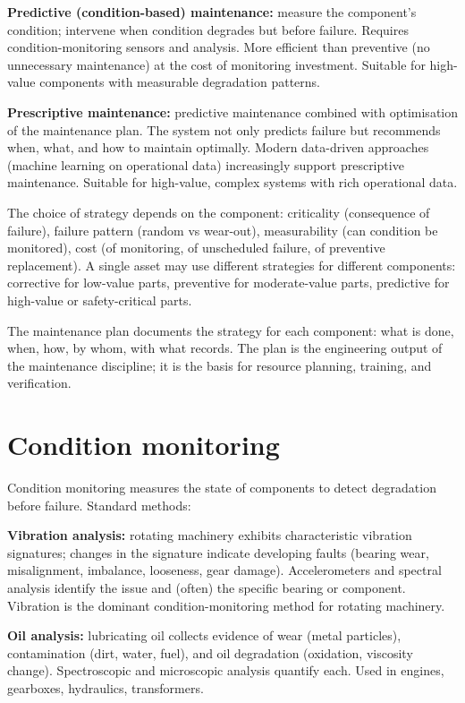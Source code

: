 \textbf{Predictive (condition-based) maintenance:} measure the component's condition; intervene when condition degrades but before failure. Requires condition-monitoring sensors and analysis. More efficient than preventive (no unnecessary maintenance) at the cost of monitoring investment. Suitable for high-value components with measurable degradation patterns.

\textbf{Prescriptive maintenance:} predictive maintenance combined with optimisation of the maintenance plan. The system not only predicts failure but recommends when, what, and how to maintain optimally. Modern data-driven approaches (machine learning on operational data) increasingly support prescriptive maintenance. Suitable for high-value, complex systems with rich operational data.

The choice of strategy depends on the component: criticality (consequence of failure), failure pattern (random vs wear-out), measurability (can condition be monitored), cost (of monitoring, of unscheduled failure, of preventive replacement). A single asset may use different strategies for different components: corrective for low-value parts, preventive for moderate-value parts, predictive for high-value or safety-critical parts.

The maintenance plan documents the strategy for each component: what is done, when, how, by whom, with what records. The plan is the engineering output of the maintenance discipline; it is the basis for resource planning, training, and verification.

\section{Condition monitoring}

Condition monitoring measures the state of components to detect degradation before failure. Standard methods:

\textbf{Vibration analysis:} rotating machinery exhibits characteristic vibration signatures; changes in the signature indicate developing faults (bearing wear, misalignment, imbalance, looseness, gear damage). Accelerometers and spectral analysis identify the issue and (often) the specific bearing or component. Vibration is the dominant condition-monitoring method for rotating machinery.

\textbf{Oil analysis:} lubricating oil collects evidence of wear (metal particles), contamination (dirt, water, fuel), and oil degradation (oxidation, viscosity change). Spectroscopic and microscopic analysis quantify each. Used in engines, gearboxes, hydraulics, transformers.

